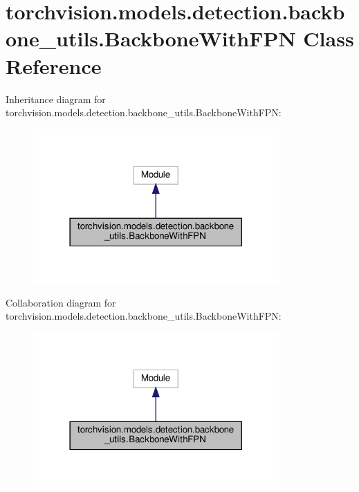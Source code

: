 \hypertarget{classtorchvision_1_1models_1_1detection_1_1backbone__utils_1_1BackboneWithFPN}{}\section{torchvision.\+models.\+detection.\+backbone\+\_\+utils.\+Backbone\+With\+F\+PN Class Reference}
\label{classtorchvision_1_1models_1_1detection_1_1backbone__utils_1_1BackboneWithFPN}


Inheritance diagram for torchvision.\+models.\+detection.\+backbone\+\_\+utils.\+Backbone\+With\+F\+PN\+:
\nopagebreak
\begin{figure}[H]
\begin{center}
\leavevmode
\includegraphics[width=266pt]{classtorchvision_1_1models_1_1detection_1_1backbone__utils_1_1BackboneWithFPN__inherit__graph}
\end{center}
\end{figure}


Collaboration diagram for torchvision.\+models.\+detection.\+backbone\+\_\+utils.\+Backbone\+With\+F\+PN\+:
\nopagebreak
\begin{figure}[H]
\begin{center}
\leavevmode
\includegraphics[width=266pt]{classtorchvision_1_1models_1_1detection_1_1backbone__utils_1_1BackboneWithFPN__coll__graph}
\end{center}
\end{figure}
